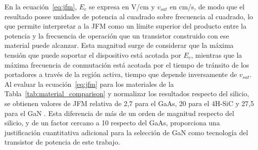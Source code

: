 En la ecuación~\eqref{eq:jfm}, $E_c$ se expresa en V/cm y $v_{sat}$ en cm/s, de modo que el resultado posee unidades de potencia al cuadrado sobre frecuencia al cuadrado, lo que permite interpretar a la JFM como un límite superior del producto entre la potencia y la frecuencia de operación que un transistor construido con ese material puede alcanzar. Esta magnitud surge de considerar que la máxima tensión que puede soportar el dispositivo está acotada por $E_c$, mientras que la máxima frecuencia de conmutación está acotada por el tiempo de tránsito de los portadores a través de la región activa, tiempo que depende inversamente de $v_{sat}$. Al evaluar la ecuación~\eqref{eq:jfm} para los materiales de la Tabla~\ref{tab:material_comparison} y normalizar los resultados respecto del silicio, se obtienen valores de JFM relativa de 2{,}7 para el GaAs, 20 para el 4H-SiC y 27{,}5 para el GaN \cite{Mishra2008}. Esta diferencia de más de un orden de magnitud respecto del silicio, y de un factor cercano a 10 respecto del GaAs, proporciona una justificación cuantitativa adicional para la selección de GaN como tecnología del transistor de potencia de este trabajo.